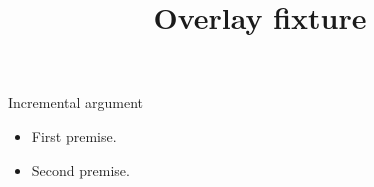 \documentclass{beamer}
\title{Overlay fixture}
\begin{document}
\begin{frame}{Incremental argument}
  \begin{itemize}
    \item<1-> First premise.
    \item<2-> Second premise.
  \end{itemize}
\end{frame}
\end{document}
